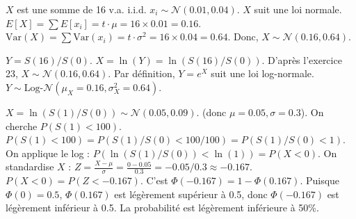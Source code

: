 \begin{correctionbox}
$X$ est une somme de 16 v.a. i.i.d. $x_i \sim \mathcal{N}(0.01, 0.04)$.
$X$ suit une loi normale.
$E[X] = \sum E[x_i] = t \cdot \mu = 16 \times 0.01 = 0.16$.
$\text{Var}(X) = \sum \text{Var}(x_i) = t \cdot \sigma^2 = 16 \times 0.04 = 0.64$.
Donc, $X \sim \mathcal{N}(0.16, 0.64)$.
\end{correctionbox}

\begin{correctionbox}
$Y = S(16)/S(0)$. $X = \ln(Y) = \ln(S(16)/S(0))$.
D'après l'exercice 23, $X \sim \mathcal{N}(0.16, 0.64)$.
Par définition, $Y = e^X$ suit une loi log-normale.
$Y \sim \text{Log-}\mathcal{N}(\mu_X=0.16, \sigma_X^2=0.64)$.
\end{correctionbox}

\begin{correctionbox}
$X = \ln(S(1)/S(0)) \sim \mathcal{N}(0.05, 0.09)$. (donc $\mu=0.05, \sigma=0.3$).
On cherche $P(S(1) < 100)$.
$P(S(1) < 100) = P(S(1)/S(0) < 100/100) = P(S(1)/S(0) < 1)$.
On applique le log :
$P(\ln(S(1)/S(0)) < \ln(1)) = P(X < 0)$.
On standardise $X$ :
$Z = \frac{X - \mu}{\sigma} = \frac{0 - 0.05}{0.3} = -0.05 / 0.3 \approx -0.167$.
$P(X < 0) = P(Z < -0.167)$.
C'est $\Phi(-0.167) = 1 - \Phi(0.167)$. Puisque $\Phi(0) = 0.5$, $\Phi(0.167)$ est légèrement supérieur à 0.5, donc $\Phi(-0.167)$ est légèrement inférieur à 0.5. La probabilité est légèrement inférieure à 50\%.
\end{correctionbox}

